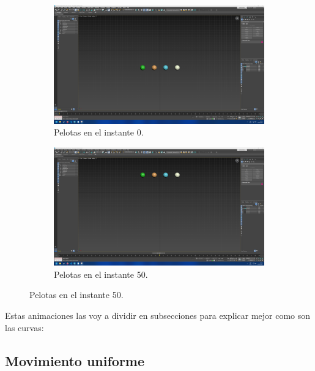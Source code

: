 \documentclass{article}
\begin{document}
{%
\begin{figure}[H]
    \centering 
	\begin{subfigure}[H]{0.48\textwidth}
	    \centering
	    \includegraphics[width=\textwidth]{imagenes/Ejercicio 1/keyframes/0.png}
        \caption{Pelotas en el instante 0.}
    \end{subfigure}
    \hfill
	\begin{subfigure}[H]{0.48\textwidth}
	    \centering
	    \includegraphics[width=\textwidth]{imagenes/Ejercicio 1/keyframes/50.png}
        \caption{Pelotas en el instante 50.}
    \end{subfigure}    
\end{figure}

\bigskip

Estas animaciones las voy a dividir en subsecciones para explicar mejor como son las curvas:

\subsection{Movimiento uniforme}

}
\end{document}
